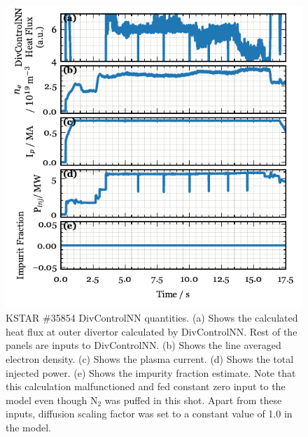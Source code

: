 \begin{figure}[!ht]
 \centering
 \includegraphics[width=\linewidth]{figures/SM_inputs_35854.pdf}
 \caption{
KSTAR \#35854 DivControlNN quantities.
(a) Shows the calculated heat flux at outer divertor calculated by DivControlNN.
Rest of the panels are inputs to DivControlNN.
(b) Shows the line averaged electron density.
(c) Shows the plasma current.
(d) Shows the total injected power.
(e) Shows the impurity fraction estimate.
Note that this calculation malfunctioned and fed constant zero input to the model even though N$_2$ was puffed in this shot.
Apart from these inputs, diffusion scaling factor was set to a constant value of 1.0 in the model.
}
 \label{fig:SM_inputs_35854}
\end{figure}